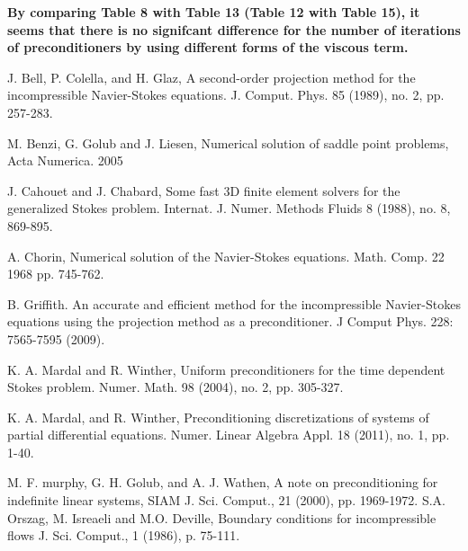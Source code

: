 \documentclass[9pt]{article}
\begin{document}
{\bf By comparing Table 8 with Table 13 (Table 12 with Table 15), it seems that there is no signifcant difference for the number of iterations of preconditioners by using different forms of the viscous term.}


%
\begin{thebibliography}{00}
J. Bell, P. Colella, and H. Glaz, A second-order projection method for the incompressible Navier-Stokes equations. J. Comput. Phys. 85 (1989), no. 2, pp. 257-283.

M. Benzi, G. Golub and J. Liesen, Numerical solution of saddle point problems, Acta Numerica. 2005

J. Cahouet and J. Chabard, Some fast 3D finite element solvers for the generalized Stokes problem. Internat. J. Numer. Methods Fluids 8 (1988), no. 8, 869-895.

A. Chorin, Numerical solution of the Navier-Stokes equations. Math. Comp. 22 1968 pp. 745-762.

B. Griffith. An accurate and efficient method for the incompressible Navier-Stokes equations using the projection method as a preconditioner. J Comput Phys. 228: 7565-7595 (2009).

K. A. Mardal and R. Winther, Uniform preconditioners for the time dependent Stokes problem. Numer. Math. 98 (2004), no. 2, pp. 305-327.

K. A. Mardal, and R. Winther, Preconditioning discretizations of systems of partial differential equations. Numer. Linear Algebra Appl. 18 (2011), no. 1, pp. 1-40.

M. F. murphy, G. H. Golub, and A. J. Wathen, A note on
preconditioning for indefinite linear systems, SIAM J. Sci. Comput.,
21 (2000), pp. 1969-1972.
S.A. Orszag, M. Isreaeli and M.O. Deville, Boundary conditions for incompressible flows
J. Sci. Comput., 1 (1986), p. 75-111.


\end{thebibliography}



\end{document}
